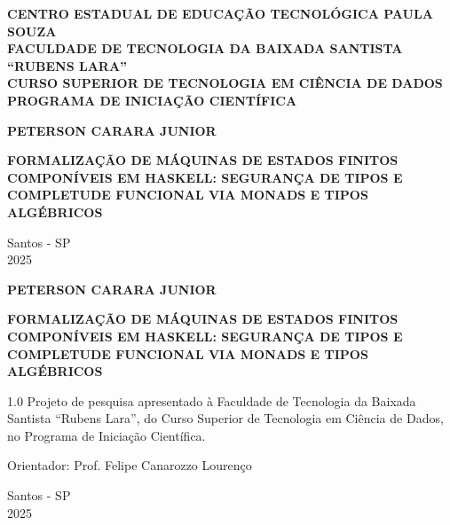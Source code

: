 \documentclass[12pt,a4paper]{article}
\newcommand{\nomealuno}{PETERSON CARARA JUNIOR}
\newcommand{\titulo}{Formalização de Máquinas de Estados Finitos Componíveis em Haskell}
\newcommand{\subtitulo}{Segurança de Tipos e Completude Funcional via Monads e Tipos Algébricos}
\newcommand{\curso}{Curso Superior de Tecnologia em Ciência de Dados}
\newcommand{\orientador}{Prof. Felipe Canarozzo Lourenço}
\newcommand{\cidade}{Santos - SP}
\newcommand{\ano}{2025}
\begin{document}
\begin{titlepage}
    \begin{center}
        \MakeUppercase{\textbf{Centro Estadual de Educação Tecnológica Paula Souza}}\\
        \MakeUppercase{\textbf{Faculdade de Tecnologia da Baixada Santista ``Rubens Lara''}}\\
        \MakeUppercase{\textbf{\curso}}\\
        \MakeUppercase{\textbf{Programa de Iniciação Científica}}
        
        \vspace{6cm}
        
        \MakeUppercase{\textbf{\nomealuno}}
        
        \vspace{4cm}
        
        \MakeUppercase{\textbf{\titulo: \subtitulo}}
        
        \vfill
        
        \cidade\\
        \ano
    \end{center}
\end{titlepage}

\begin{titlepage}
    \begin{center}
        \MakeUppercase{\textbf{\nomealuno}}
        
        \vspace{6cm}
        
        \MakeUppercase{\textbf{\titulo: \subtitulo}}
        
        \vspace{3cm}
        
        \begin{flushright}
            \begin{minipage}{8cm}
                \begin{spacing}{1.0}
                    Projeto de pesquisa apresentado à Faculdade de Tecnologia da Baixada Santista ``Rubens Lara'', do \curso, no Programa de Iniciação Científica.
                    
                    \vspace{0.5cm}
                    
                    Orientador: \orientador
                \end{spacing}
            \end{minipage}
        \end{flushright}
        
        \vfill
        
        \cidade\\
        \ano
    \end{center}
\end{titlepage}
\end{document}
